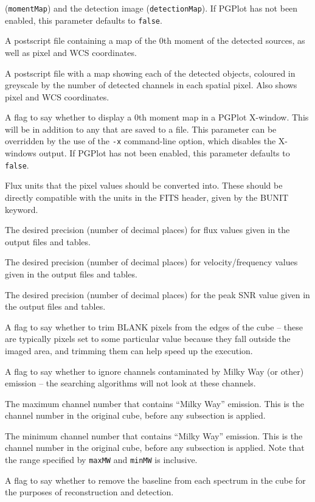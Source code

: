 \begin{Lentry}
  (\texttt{momentMap}) and the detection image
  (\texttt{detectionMap}). If PGPlot has not been enabled, this
  parameter defaults to \texttt{false}.
\item[{momentMap [duchamp-\\MomentMap.ps]}] A postscript file
  containing a map of the 0th moment of the detected sources, as well
  as pixel and WCS coordinates.
\item[{detectionMap [duchamp-\\DetectionMap.ps]}] A postscript
  file with a map showing each of the detected objects, coloured in
  greyscale by the number of detected channels in each spatial
  pixel. Also shows pixel and WCS coordinates.
\item[{flagXOutput [true]}] A flag to say whether to display a
  0th moment map in a PGPlot X-window. This will be in addition to any
  that are saved to a file. This parameter can be overridden by the
  use of the \texttt{-x} command-line option, which disables the
  X-windows output. If PGPlot has not been enabled, this parameter
  defaults to \texttt{false}.
\item[{newFluxUnits [no default]}] Flux units that the pixel values
  should be converted into. These should be directly compatible with
  the units in the FITS header, given by the BUNIT keyword.
\item[{precFlux [3]}] The desired precision (\ie number of decimal
  places) for flux values given in the output files and tables.
\item[{precVel [3]}] The desired precision (\ie number of decimal
  places) for velocity/frequency values given in the output files and
  tables.
\item[{precSNR [2]}] The desired precision (\ie number of decimal
  places) for the peak SNR value given in the output files and tables.
\end{Lentry}

\begin{Lentry}
\item[{flagTrim [false]}] A flag to say whether to trim
  BLANK pixels from the edges of the cube -- these are typically
  pixels set to some particular value because they fall outside the
  imaged area, and trimming them can help speed up the execution.
\item[{flagMW [false]}] A flag to say whether to ignore
  channels contaminated by Milky Way (or other) emission -- the
  searching algorithms will not look at these channels.
\item[{maxMW [112]}] The maximum channel number that contains
  ``Milky Way'' emission. This is the channel number in the original
  cube, before any subsection is applied.
\item[{minMW [75]}] The minimum channel number that contains ``Milky
  Way'' emission. This is the channel number in the original cube,
  before any subsection is applied.  Note that the range specified by
  \texttt{maxMW} and \texttt{minMW} is inclusive.
\item[{flagBaseline [false]}] A flag to say whether to remove
  the baseline from each spectrum in the cube for the purposes of
  reconstruction and detection.
\end{Lentry}

